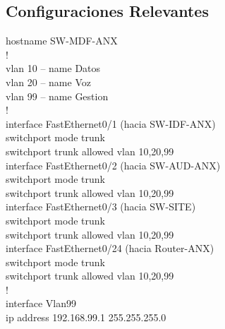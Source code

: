 \documentclass[11pt, letterpaper]{article}
\begin{document}
\subsection*{Configuraciones Relevantes}

\begin{tcolorbox}[enhanced, breakable, colback=black!95, colframe=OroUNAM,
                  title=\textbf{SW-MDF-ANX -- Switch Core (MDF)}, arc=2mm, boxrule=1pt,
                  attach boxed title to top left={xshift=5mm, yshift=-3mm},
                  boxed title style={colback=OroUNAM},
                  fontupper=\ttfamily\small\color{white}]
hostname SW-MDF-ANX\\
!\\
vlan 10 -- name Datos\\
vlan 20 -- name Voz\\
vlan 99 -- name Gestion\\
!\\
interface FastEthernet0/1  (hacia SW-IDF-ANX)\\
\hspace{1em}switchport mode trunk\\
\hspace{1em}switchport trunk allowed vlan 10,20,99\\
interface FastEthernet0/2  (hacia SW-AUD-ANX)\\
\hspace{1em}switchport mode trunk\\
\hspace{1em}switchport trunk allowed vlan 10,20,99\\
interface FastEthernet0/3  (hacia SW-SITE)\\
\hspace{1em}switchport mode trunk\\
\hspace{1em}switchport trunk allowed vlan 10,20,99\\
interface FastEthernet0/24  (hacia Router-ANX)\\
\hspace{1em}switchport mode trunk\\
\hspace{1em}switchport trunk allowed vlan 10,20,99\\
!\\
interface Vlan99\\
\hspace{1em}ip address 192.168.99.1 255.255.255.0
\end{tcolorbox}
\end{document}
